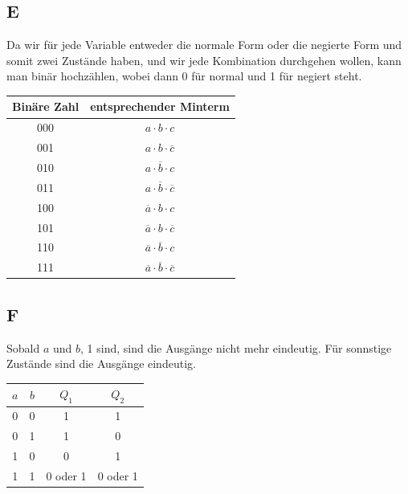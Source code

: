 \documentclass[10pt]{article}
\begin{document}
\begin{multicols}{2}
	\subsection*{E}
	Da wir für jede Variable entweder die normale Form oder die negierte Form und somit zwei Zustände haben, und wir jede Kombination durchgehen wollen, kann man binär hochzählen, wobei dann 0 für normal und 1 für negiert steht.
	\begin{center}
		\begin{tabular}{|c|c|}
			\hline
			Binäre Zahl & entsprechender Minterm                               \\
			\hline
			000         & $a \cdot b \cdot c$                                  \\
			001         & $a \cdot b \cdot \overline{c}$                       \\
			010         & $a \cdot \overline{b} \cdot c$                       \\
			011         & $a \cdot \overline{b} \cdot \overline{c}$            \\
			100         & $\overline{a} \cdot b \cdot c$                       \\
			101         & $\overline{a} \cdot b \cdot \overline{c}$            \\
			110         & $\overline{a} \cdot \overline{b} \cdot c$            \\
			111         & $\overline{a} \cdot \overline{b} \cdot \overline{c}$ \\
			\hline
		\end{tabular}
	\end{center}
	\subsection*{F}
	Sobald $a$ und $b$, 1 sind, sind die Ausgänge nicht mehr eindeutig. Für sonnstige Zustände sind die Ausgänge eindeutig.
	\begin{center}
		\begin{tabular}{|c|c|c|c|}
			\hline
			$a$ & $b$ & $Q_1$    & $Q_2$    \\
			\hline
			0   & 0   & 1        & 1        \\
			0   & 1   & 1        & 0        \\
			1   & 0   & 0        & 1        \\
			1   & 1   & 0 oder 1 & 0 oder 1 \\
			\hline
		\end{tabular}
		\label{tab:fff}
	\end{center}

\end{multicols}
\end{document}
